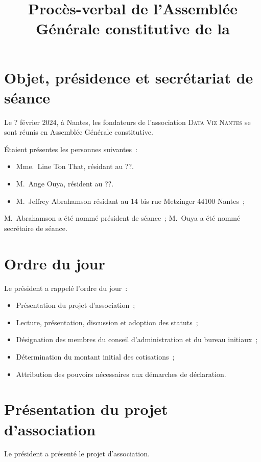 \documentclass[12pt]{article}
\title{Procès-verbal de l'Assemblée Générale constitutive de la \Nom}
\date{}
\newcommand{\quand}{? février 2024}
\newcommand{\Nom}{\textsc{Data Viz Nantes}}
\begin{document}
\maketitle

\section{Objet, présidence et secrétariat de séance}
\label{sec:objet}

Le \quand, à Nantes, les fondateurs de l'association \Nom{} se
sont réunis en Assemblée Générale constitutive.

Étaient présentes les personnes suivantes :

\begin{itemize}
\item Mme.~Line Ton That, résidant au ??.
\item M.~Ange Ouya, résident au ??.
\item M.~Jeffrey Abrahamson résidant au 14 bis rue Metzinger 44100
  Nantes ;
\end{itemize}

M.~Abrahamson a été nommé président de séance ; M.~Ouya a été nommé
secrétaire de séance.

\section{Ordre du jour}
\label{sec:ordre-du-jour}

Le président a rappelé l'ordre du jour :

\begin{itemize}
\item Présentation du projet d'association ;
\item Lecture, présentation, discussion et adoption des statuts ;
\item Désignation des membres du conseil d'administration et du bureau
  initiaux ;
\item Détermination du montant initial des cotisations ;
\item Attribution des pouvoirs nécessaires aux démarches de déclaration.
\end{itemize}

\section{Présentation du projet d'association}
\label{sec:presentation-du-projet-d-association}

Le président a présenté le projet d'association.
\end{document}

